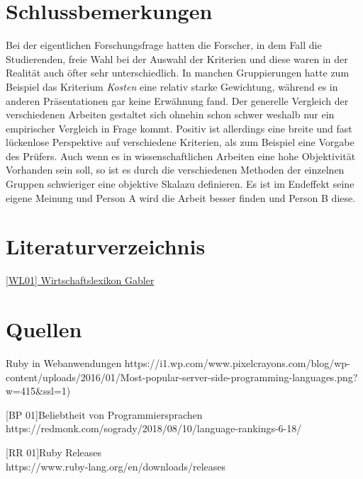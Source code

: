 \documentclass[12pt,DIV=14, version=first, BCOR=10mm,a4paper,twoside,parskip=half-,headsepline,headinclude]{scrartcl}
\begin{document}
\section{Schlussbemerkungen}
\begin{flushleft}
Bei der eigentlichen Forschungsfrage hatten die Forscher, in dem Fall die Studierenden, freie Wahl bei der Auswahl der Kriterien und diese waren in der Realität auch öfter sehr unterschiedlich. In manchen Gruppierungen hatte zum Beispiel das Kriterium \textit{Kosten} eine relativ starke Gewichtung, während es in anderen Präsentationen gar keine Erwähnung fand. Der generelle Vergleich der verschiedenen Arbeiten gestaltet sich ohnehin schon schwer weshalb nur ein empirischer Vergleich in Frage kommt. Positiv ist allerdings eine breite und fast lückenlose Perspektive auf verschiedene Kriterien, als zum Beispiel eine Vorgabe des Prüfers. Auch wenn es in wissenschaftlichen Arbeiten eine hohe Objektivität Vorhanden sein soll, so ist es durch die verschiedenen Methoden der einzelnen Gruppen schwieriger eine \glqq objektive Skala\grqq zu definieren. Es ist im Endeffekt seine eigene Meinung und Person A wird die Arbeit besser finden und Person B diese.
\end{flushleft}
\pagebreak

\section{Literaturverzeichnis}
\begin{flushleft}
\href{https://wirtschaftslexikon.gabler.de/definition/objektorientierung-43907} {[WL01] Wirtschaftslexikon Gabler}
\end{flushleft}

\section{Quellen}
\begin{flushleft}
[RW 01]Ruby in Webanwendungen
https://i1.wp.com/www.pixelcrayons.com/blog/wp-content/uploads/2016/01/Most-popular-server-side-programming-languages.png?w=415{\&}ssl=1)

[BP 01]Beliebtheit von Programmiersprachen
https://redmonk.com/sogrady/2018/08/10/language-rankings-6-18/

[RR 01]Ruby Releases\\
https://www.ruby-lang.org/en/downloads/releases
\end{flushleft}


%
\end{document}
